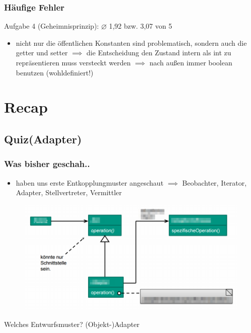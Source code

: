 \documentclass[18pt]{beamer}
\begin{document}
	\begin{frame}
		\frametitle{Häufige Fehler}
		\begin{block}{Aufgabe 4 (Geheimnisprinzip): $\diameter$ 1,92 bzw. 3,07 von 5}
			\begin{itemize}
				\pause
				\item nicht nur die öffentlichen Konstanten sind problematisch, sondern auch die getter und setter \pause
				\linebreak $\implies$ die Entscheidung den Zustand intern als int zu repräsentieren muss versteckt werden \pause 
				\linebreak $\implies$ nach außen immer boolean benutzen (wohldefiniert!)
			\end{itemize}
		\end{block}
	\end{frame}

\section{Recap}
	\subsection{Quiz(Adapter)}
	\begin{frame}
		\frametitle{Was bisher geschah..}
		\begin{itemize}
			\item haben uns erste Entkopplungmuster angeschaut \pause
			\linebreak $\implies$ Beobachter, Iterator, Adapter, Stellvertreter, Vermittler \pause
		\end{itemize}
		\begin{figure}
			\includegraphics[scale=0.33]{./pics/tut4/adap-obj-mod.png}
		\end{figure}
		Welches Entwurfsmuster? \pause (Objekt-)Adapter
	\end{frame}
	
\end{document}
